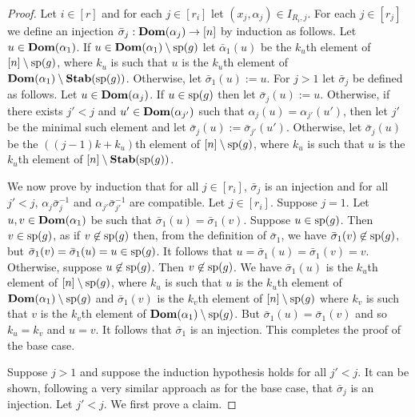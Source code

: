 \documentclass[../main/thesis.tex]{subfiles}
\begin{document}
\begin{proof}
  Let $i \in [r]$ and for each $j \in [r_i]$ let $(x_j, \alpha_j) \in I_{R_i,
    j}$. For each $j \in [r_j]$ we define an injection $\bar{\sigma}_j :
  \text{\textbf{Dom}}(\alpha_j) \rightarrow [n]$ by induction as follows. Let $u \in \text{\textbf{Dom}} (\alpha_1)$.
  If $u \in \text{\textbf{Dom}}(\alpha_1) \setminus \text{sp}(g)$ let $\bar{\alpha}_1 (u)$ be the
  $k_u$th element of $[n] \setminus \text{sp}(g)$, where $k_u$ is such that $u$ is
  the $k_u$th element of $\text{\textbf{Dom}}(\alpha_1) \setminus \text{\textbf{Stab}} (\text{sp} (g))$. Otherwise, let
  $\bar{\sigma}_1 (u) := u$. For $j > 1$ let $\bar{\sigma}_j$ be defined as
  follows. Let $u \in \text{\textbf{Dom}} (\alpha_j)$. If $u \in \text{sp}(g)$ then let
  $\bar{\sigma}_j(u) := u$. Otherwise, if there exists $j' < j$ and $u' \in \text{\textbf{Dom}}
  (\alpha_{j'})$ such that $\alpha_j (u) = \alpha_{j'}(u')$, then let $j'$ be
  the minimal such element and let $\bar{\sigma}_j (u) :=
  \bar{\sigma}_{j'}(u')$. Otherwise, let $\bar{\sigma}_j (u)$ be the $((j - 1)k
  + k_u)$th element of $[n] \setminus \text{sp}(g)$, where $k_u$ is such that $u$
  is the $k_u$th element of $[n] \setminus \text{\textbf{Stab}} (\text{sp} (g))$.

  We now prove by induction that for all $j \in [r_i]$, $\bar{\sigma}_j$ is an
  injection and for all $j' < j$, $\alpha_j \bar{\sigma}^{-1}_j$ and
  $\alpha_{j'} \bar{\sigma}^{-1}_{j'}$ are compatible. Let $j \in [r_i]$.
  Suppose $j = 1$. Let $u, v \in \text{\textbf{Dom}}(\alpha_1)$ be such that $\bar{\sigma}_1(u)
  = \bar{\sigma}_1(v)$. Suppose $u \in \text{sp}(g)$. Then $v \in \text{sp}(g)$, as if
  $v \not\in \text{sp}(g)$ then, from the definition of $\bar{\sigma}_1$, we have
  $\bar{\sigma}_1 (v) \not\in \text{sp}(g)$, but $\bar{\sigma}_1(v) =
  \bar{\sigma}_1(u) = u \in \text{sp}(g)$. It follows that $u = \bar{\sigma}_1(u) =
  \bar{\sigma}_1(v) = v$. Otherwise, suppose $u \not\in \text{sp}(g)$. Then $v
  \not\in \text{sp}(g)$. We have $\bar{\sigma}_1(u)$ is the $k_u$th element of $[n]
  \setminus \text{sp}(g)$, where $k_u$ is such that $u$ is the $k_u$th element of
  $\text{\textbf{Dom}}(\alpha_1) \setminus \text{sp}(g)$ and $\bar{\sigma}_1(v)$ is the $k_v$th
  element of $[n] \setminus \text{sp}(g)$ where $k_v$ is such that $v$ is the
  $k_v$th element of $\text{\textbf{Dom}}(\alpha_1) \setminus \text{sp}(g)$. But
  $\bar{\sigma}_1(u) = \bar{\sigma}_1 (v)$ and so $k_u = k_v$ and $u = v$. It
  follows that $\bar{\sigma}_1$ is an injection. This completes the proof of the
  base case.

  Suppose $j > 1$ and suppose the induction hypothesis holds for all $j' < j$.
  It can be shown, following a very similar approach as for the base case, that
  $\bar{\sigma}_j$ is an injection. Let $j' < j$. We first prove a claim.
  

\end{proof}
\end{document}

